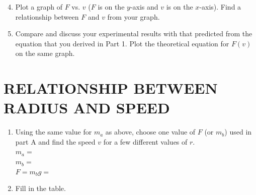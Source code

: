 \documentclass[11pt,letterpaper]{article}
\begin{document}
\begin{enumerate}
\setcounter{enumi}{3}
\item Plot a graph of $F$ vs. $v$ ($F$ is on the $y$-axis and $v$ is on the $x$-axis). Find a relationship between $F$ and $v$ from your graph.

\item Compare and discuss your experimental results with that predicted from the equation that you derived in Part 1. Plot the theoretical equation for $F(v)$ on the same graph.
\end{enumerate}



\section{RELATIONSHIP BETWEEN RADIUS AND SPEED}
\begin{enumerate}
\item Using the same value for $m_a$ as above, choose one value of $F$
    (or $m_b$) used in part A and find the speed $v$ for a few different values
    of $r$.\\ 
    $m_a=$\\
    
    $m_b=$\\
    
    $F=m_bg=$

\item Fill in the table.
\end{enumerate}

\vspace{.5cm}
\end{document}
